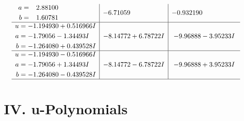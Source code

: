\documentclass[1p]{elsarticle_modified}
\theoremstyle{definition}
\begin{document}
$$\begin{array}{c|c|c}
\begin{aligned}
a &= \phantom{-}2.88100\phantom{ +0.000000I} \\
b &= \phantom{-}1.60781\phantom{ +0.000000I}\end{aligned}
 & -6.71059\phantom{ +0.000000I} & -0.932190\phantom{ +0.000000I} \\ \hline\begin{aligned}
u &= -1.194930 + 0.516966 I \\
a &= -1.79056 - 1.34493 I \\
b &= -1.264080 + 0.439528 I\end{aligned}
 & -8.14772 + 6.78722 I & -9.96888 - 3.95233 I \\ \hline\begin{aligned}
u &= -1.194930 - 0.516966 I \\
a &= -1.79056 + 1.34493 I \\
b &= -1.264080 - 0.439528 I\end{aligned}
 & -8.14772 - 6.78722 I & -9.96888 + 3.95233 I\\
 \hline 
 \end{array}$$\newpage
\newpage\renewcommand{\arraystretch}{1}
\centering \section*{ IV. u-Polynomials}
\end{document}
